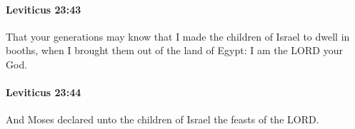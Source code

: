 		\paragraph{Leviticus 23:43} %
			\label{LEVITICUS-23-43}

			That your generations may know that I made the children of Israel to dwell in booths, when I brought them out of the land of Egypt: I am the LORD your God.


		\paragraph{Leviticus 23:44} %
			\label{LEVITICUS-23-44}

			And Moses declared unto the children of Israel the feasts of the LORD.

